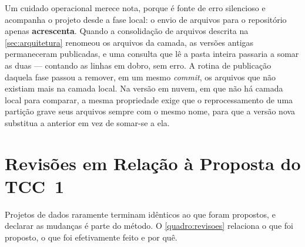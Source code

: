 Um cuidado operacional merece nota, porque é fonte de erro silencioso e acompanha o projeto desde a fase local: o envio de arquivos para o repositório apenas \textbf{acrescenta}. Quando a consolidação de arquivos descrita na \autoref{sec:arquitetura} renomeou os arquivos da camada, as versões antigas permaneceram publicadas, e uma consulta que lê a pasta inteira passaria a somar as duas --- contando as linhas em dobro, sem erro. A rotina de publicação daquela fase passou a remover, em um mesmo \textit{commit}, os arquivos que não existiam mais na camada local. Na versão em nuvem, em que não há camada local para comparar, a mesma propriedade exige que o reprocessamento de uma partição grave seus arquivos sempre com o mesmo nome, para que a versão nova substitua a anterior em vez de somar-se a ela.

\section{Revisões em Relação à Proposta do TCC~1}
\label{sec:revisoes}

Projetos de dados raramente terminam idênticos ao que foram propostos, e declarar as mudanças é parte do método. O \autoref{quadro:revisoes} relaciona o que foi proposto, o que foi efetivamente feito e por quê.

